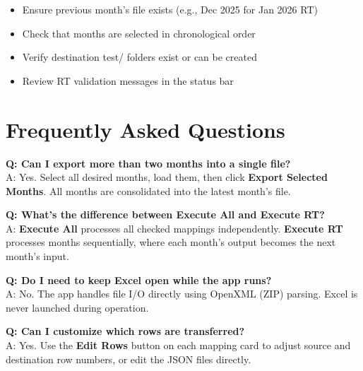 \documentclass[11pt,a4paper]{article}
\begin{document}
\begin{itemize}[leftmargin=*, itemsep=4pt]
\item Ensure previous month's file exists (e.g., Dec 2025 for Jan 2026 RT)
\item Check that months are selected in chronological order
\item Verify destination test/ folders exist or can be created
\item Review RT validation messages in the status bar
\end{itemize}

\section{Frequently Asked Questions}

\begin{stepbox}
\textbf{Q: Can I export more than two months into a single file?}\\
A: Yes. Select all desired months, load them, then click \textbf{Export Selected Months}. All months are consolidated into the latest month's file.
\end{stepbox}

\vspace{0.4cm}

\begin{stepbox}
\textbf{Q: What's the difference between Execute All and Execute RT?}\\
A: \textbf{Execute All} processes all checked mappings independently. \textbf{Execute RT} processes months sequentially, where each month's output becomes the next month's input.
\end{stepbox}

\vspace{0.4cm}

\begin{stepbox}
\textbf{Q: Do I need to keep Excel open while the app runs?}\\
A: No. The app handles file I/O directly using OpenXML (ZIP) parsing. Excel is never launched during operation.
\end{stepbox}

\vspace{0.4cm}

\begin{stepbox}
\textbf{Q: Can I customize which rows are transferred?}\\
A: Yes. Use the \textbf{Edit Rows} button on each mapping card to adjust source and destination row numbers, or edit the JSON files directly.
\end{stepbox}
\end{document}
